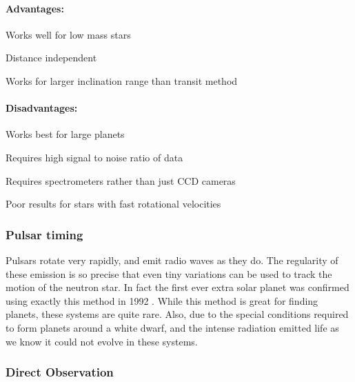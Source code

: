 \paragraph{Advantages:}
\begin{itemize*}
    \item Works well for low mass stars
    \item Distance independent
    \item Works for larger inclination range than transit method
\end{itemize*}

\paragraph{Disadvantages:}
\begin{itemize*}
    \item Works best for large planets
    \item Requires high signal to noise ratio of data
    \item Requires spectrometers rather than just CCD cameras
    \item Poor results for stars with fast rotational velocities
\end{itemize*}

\subsubsection{Pulsar timing}

Pulsars rotate very rapidly, and emit radio waves as they do. The regularity of these emission is so precise that even tiny variations can be used to track the motion of the neutron star. In fact the first ever extra solar planet was confirmed using exactly this method in 1992 \citep{wolszczan1992planetary}. While this method is great for finding planets, these systems are quite rare. Also, due to the special conditions required to form planets around a white dwarf, and the intense radiation emitted life as we know it could not evolve in these systems.

\subsubsection{Direct Observation}

